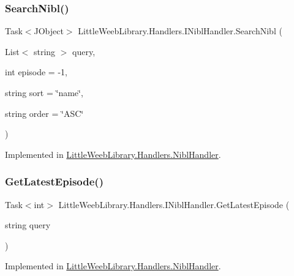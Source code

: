 \subsubsection{\texorpdfstring{Search\+Nibl()}{SearchNibl()}\hspace{0.1cm}{\footnotesize\ttfamily [2/2]}}
{\footnotesize\ttfamily Task$<$J\+Object$>$ Little\+Weeb\+Library.\+Handlers.\+I\+Nibl\+Handler.\+Search\+Nibl (\begin{DoxyParamCaption}\item[{List$<$ string $>$}]{query,  }\item[{int}]{episode = {\ttfamily -\/1},  }\item[{string}]{sort = {\ttfamily \char`\"{}name\char`\"{}},  }\item[{string}]{order = {\ttfamily \char`\"{}ASC\char`\"{}} }\end{DoxyParamCaption})}



Implemented in \mbox{\hyperlink{class_little_weeb_library_1_1_handlers_1_1_nibl_handler_acffe025c2b1158bc67196879622dfa0a}{Little\+Weeb\+Library.\+Handlers.\+Nibl\+Handler}}.

\mbox{\label{interface_little_weeb_library_1_1_handlers_1_1_i_nibl_handler_a7e3c7dc7ba9a01c39d125dc0a759d606}} 
\subsubsection{\texorpdfstring{Get\+Latest\+Episode()}{GetLatestEpisode()}}
{\footnotesize\ttfamily Task$<$int$>$ Little\+Weeb\+Library.\+Handlers.\+I\+Nibl\+Handler.\+Get\+Latest\+Episode (\begin{DoxyParamCaption}\item[{string}]{query }\end{DoxyParamCaption})}



Implemented in \mbox{\hyperlink{class_little_weeb_library_1_1_handlers_1_1_nibl_handler_a149bf3305de6348eaddee4afb92d5095}{Little\+Weeb\+Library.\+Handlers.\+Nibl\+Handler}}.

